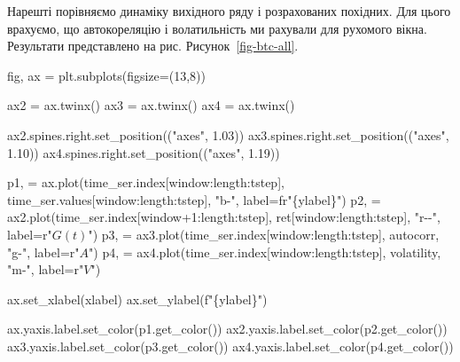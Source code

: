 \documentclass[
  letterpaper,
]{report}
\newenvironment{Shaded}{\begin{snugshade}}{\end{snugshade}}
\newcommand{\DecValTok}[1]{\textcolor[rgb]{0.68,0.00,0.00}{#1}}
\newcommand{\FloatTok}[1]{\textcolor[rgb]{0.68,0.00,0.00}{#1}}
\newcommand{\NormalTok}[1]{\textcolor[rgb]{0.00,0.23,0.31}{#1}}
\newcommand{\OperatorTok}[1]{\textcolor[rgb]{0.37,0.37,0.37}{#1}}
\newcommand{\SpecialCharTok}[1]{\textcolor[rgb]{0.37,0.37,0.37}{#1}}
\newcommand{\SpecialStringTok}[1]{\textcolor[rgb]{0.13,0.47,0.30}{#1}}
\newcommand{\StringTok}[1]{\textcolor[rgb]{0.13,0.47,0.30}{#1}}
\newcommand{\VerbatimStringTok}[1]{\textcolor[rgb]{0.13,0.47,0.30}{#1}}
\begin{document}
Нарешті порівняємо динаміку вихідного ряду і розрахованих похідних. Для
цього врахуємо, що автокореляцію і волатильність ми рахували для
рухомого вікна. Результати представлено на рис.
Рисунок~\ref{fig-btc-all}.

\begin{Shaded}
\begin{Highlighting}[]
\NormalTok{fig, ax }\OperatorTok{=}\NormalTok{ plt.subplots(figsize}\OperatorTok{=}\NormalTok{(}\DecValTok{13}\NormalTok{,}\DecValTok{8}\NormalTok{))}

\NormalTok{ax2 }\OperatorTok{=}\NormalTok{ ax.twinx()}
\NormalTok{ax3 }\OperatorTok{=}\NormalTok{ ax.twinx()}
\NormalTok{ax4 }\OperatorTok{=}\NormalTok{ ax.twinx()}

\NormalTok{ax2.spines.right.set\_position((}\StringTok{"axes"}\NormalTok{, }\FloatTok{1.03}\NormalTok{))}
\NormalTok{ax3.spines.right.set\_position((}\StringTok{"axes"}\NormalTok{, }\FloatTok{1.10}\NormalTok{))}
\NormalTok{ax4.spines.right.set\_position((}\StringTok{"axes"}\NormalTok{, }\FloatTok{1.19}\NormalTok{))}

\NormalTok{p1, }\OperatorTok{=}\NormalTok{ ax.plot(time\_ser.index[window:length:tstep], }
\NormalTok{              time\_ser.values[window:length:tstep], }
              \StringTok{"b{-}"}\NormalTok{, label}\OperatorTok{=}\VerbatimStringTok{fr"}\SpecialCharTok{\{}\NormalTok{ylabel}\SpecialCharTok{\}}\VerbatimStringTok{"}\NormalTok{)}
\NormalTok{p2, }\OperatorTok{=}\NormalTok{ ax2.plot(time\_ser.index[window}\OperatorTok{+}\DecValTok{1}\NormalTok{:length:tstep], }
\NormalTok{               ret[window:length:tstep], }\StringTok{"r{-}{-}"}\NormalTok{, label}\OperatorTok{=}\VerbatimStringTok{r"$G(t)$"}\NormalTok{)}
\NormalTok{p3, }\OperatorTok{=}\NormalTok{ ax3.plot(time\_ser.index[window:length:tstep], }
\NormalTok{               autocorr, }\StringTok{"g{-}"}\NormalTok{, label}\OperatorTok{=}\VerbatimStringTok{r"$A$"}\NormalTok{)}
\NormalTok{p4, }\OperatorTok{=}\NormalTok{ ax4.plot(time\_ser.index[window:length:tstep],}
\NormalTok{               volatility, }\StringTok{"m{-}"}\NormalTok{, label}\OperatorTok{=}\VerbatimStringTok{r"$V$"}\NormalTok{)}

\NormalTok{ax.set\_xlabel(xlabel)}
\NormalTok{ax.set\_ylabel(}\SpecialStringTok{f"}\SpecialCharTok{\{}\NormalTok{ylabel}\SpecialCharTok{\}}\SpecialStringTok{"}\NormalTok{)}

\NormalTok{ax.yaxis.label.set\_color(p1.get\_color())}
\NormalTok{ax2.yaxis.label.set\_color(p2.get\_color())}
\NormalTok{ax3.yaxis.label.set\_color(p3.get\_color())}
\NormalTok{ax4.yaxis.label.set\_color(p4.get\_color())}


\end{Highlighting}
\end{Shaded}
\end{document}
